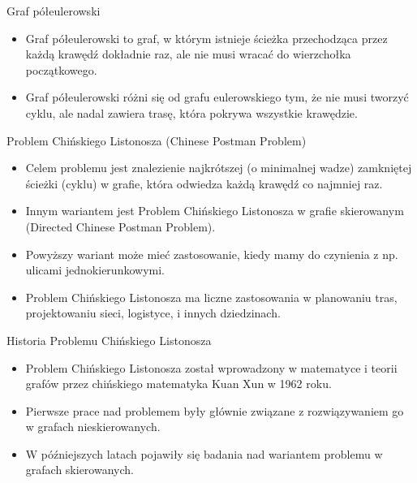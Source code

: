 \documentclass[polish,envcountsect,10pt]{beamer}
\begin{document}
\begin{frame}{Graf półeulerowski}
    \begin{itemize}
        \item Graf półeulerowski to graf, w którym istnieje ścieżka przechodząca przez każdą krawędź dokładnie raz, ale nie musi wracać do wierzchołka początkowego.
        \item Graf półeulerowski różni się od grafu eulerowskiego tym, że nie musi tworzyć cyklu, ale nadal zawiera trasę, która pokrywa wszystkie krawędzie.
    \end{itemize}
    \begin{center}
    \end{center}
\end{frame}

\begin{frame}{Problem Chińskiego Listonosza (Chinese Postman Problem)}
    \begin{itemize}
        \item Celem problemu jest znalezienie najkrótszej (o minimalnej wadze) zamkniętej ścieżki (cyklu) w grafie, która odwiedza każdą krawędź co najmniej raz.
        \item Innym wariantem jest Problem Chińskiego Listonosza w grafie skierowanym (Directed Chinese Postman Problem).
        \item Powyższy wariant może mieć zastosowanie, kiedy mamy do czynienia z np. ulicami jednokierunkowymi.
        \item Problem Chińskiego Listonosza ma liczne zastosowania w planowaniu tras, projektowaniu sieci, logistyce, i innych dziedzinach.
    \end{itemize}
\end{frame}

\begin{frame}{Historia Problemu Chińskiego Listonosza}
    \begin{itemize}
        \item Problem Chińskiego Listonosza został wprowadzony w matematyce i teorii grafów przez chińskiego matematyka Kuan Xun w 1962 roku.
        \item Pierwsze prace nad problemem były głównie związane z rozwiązywaniem go w grafach nieskierowanych.
        \item W późniejszych latach pojawiły się badania nad wariantem problemu w grafach skierowanych.
    \end{itemize}
\end{frame}
\end{document}
